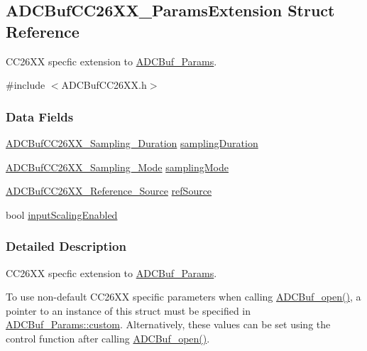 \subsection{A\+D\+C\+Buf\+C\+C26\+X\+X\+\_\+\+Params\+Extension Struct Reference}
\label{struct_a_d_c_buf_c_c26_x_x___params_extension}


C\+C26\+X\+X specfic extension to \hyperlink{struct_a_d_c_buf___params}{A\+D\+C\+Buf\+\_\+\+Params}.  




{\ttfamily \#include $<$A\+D\+C\+Buf\+C\+C26\+X\+X.\+h$>$}

\subsubsection*{Data Fields}
\begin{DoxyCompactItemize}
\item 
\hyperlink{_a_d_c_buf_c_c26_x_x_8h_a4a95bf383dea0206b6708496a034a9fb}{A\+D\+C\+Buf\+C\+C26\+X\+X\+\_\+\+Sampling\+\_\+\+Duration} \hyperlink{struct_a_d_c_buf_c_c26_x_x___params_extension_a13ae8ecf30cf89b0961f1c0dae0f8fae}{sampling\+Duration}
\item 
\hyperlink{_a_d_c_buf_c_c26_x_x_8h_a816f299f98f8fc3cc1124cda74a18d10}{A\+D\+C\+Buf\+C\+C26\+X\+X\+\_\+\+Sampling\+\_\+\+Mode} \hyperlink{struct_a_d_c_buf_c_c26_x_x___params_extension_af857a78cd52526e581e82d154793a221}{sampling\+Mode}
\item 
\hyperlink{_a_d_c_buf_c_c26_x_x_8h_a31a41d718712f3d4ff936bb566da0d0a}{A\+D\+C\+Buf\+C\+C26\+X\+X\+\_\+\+Reference\+\_\+\+Source} \hyperlink{struct_a_d_c_buf_c_c26_x_x___params_extension_ac969cbedfed803be061feb5c82d58c66}{ref\+Source}
\item 
bool \hyperlink{struct_a_d_c_buf_c_c26_x_x___params_extension_a2fc973ed16c05717691222fe517691a3}{input\+Scaling\+Enabled}
\end{DoxyCompactItemize}


\subsubsection{Detailed Description}
C\+C26\+X\+X specfic extension to \hyperlink{struct_a_d_c_buf___params}{A\+D\+C\+Buf\+\_\+\+Params}. 

To use non-\/default C\+C26\+X\+X specific parameters when calling \hyperlink{_a_d_c_buf_8h_a0b63bca2e8f8e5b58f0c657ac662c97b}{A\+D\+C\+Buf\+\_\+open()}, a pointer to an instance of this struct must be specified in \hyperlink{struct_a_d_c_buf___params_a72c7ec51318ec2f8fcf5d2ff37de33e3}{A\+D\+C\+Buf\+\_\+\+Params\+::custom}. Alternatively, these values can be set using the control function after calling \hyperlink{_a_d_c_buf_8h_a0b63bca2e8f8e5b58f0c657ac662c97b}{A\+D\+C\+Buf\+\_\+open()}. 

